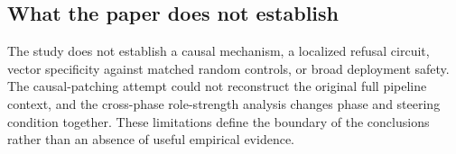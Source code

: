 \subsection{What the paper does not establish}
The study does not establish a causal mechanism, a localized refusal circuit, vector specificity against matched random controls, or broad deployment safety. The causal-patching attempt could not reconstruct the original full pipeline context, and the cross-phase role-strength analysis changes phase and steering condition together. These limitations define the boundary of the conclusions rather than an absence of useful empirical evidence.